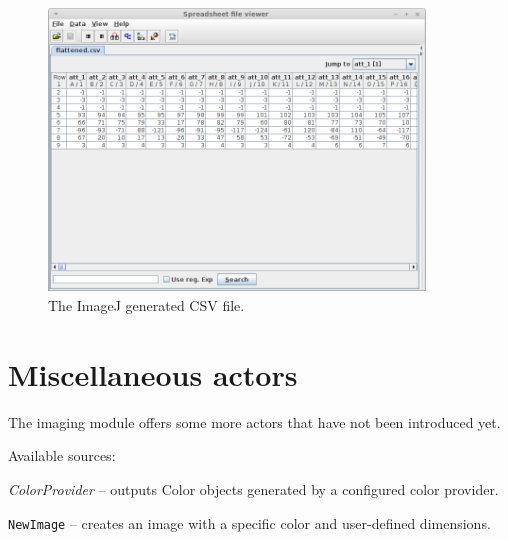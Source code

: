 \documentclass[a4paper]{book}
\begin{document}
\begin{figure}[htb]
  \centering
  \includegraphics[width=10.0cm]{images/imagej-csv-generation-dataset.png}
  \caption{The ImageJ generated CSV file.}
  \label{imagej-csv-generation-dataset}
\end{figure}


\chapter{Miscellaneous actors}
The imaging module offers some more actors that have not been introduced yet.

\noindent Available sources:
\begin{tight_itemize}
	\item \textit{ColorProvider} -- outputs Color objects generated by a 
	configured color provider.
    \item \texttt{NewImage} -- creates an image with a specific color and
    user-defined dimensions.
\end{tight_itemize}
\end{document}
